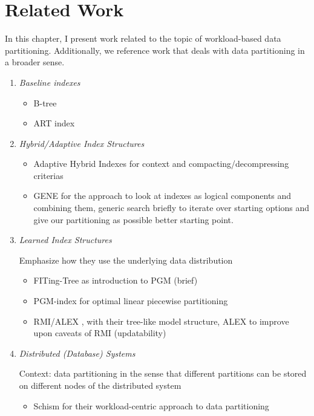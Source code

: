 \thispagestyle{plain}
\chapter{Related Work}

In this chapter, I present work related to the topic of workload-based data partitioning.
Additionally, we reference work that deals with data partitioning in a broader sense.

\begin{enumerate}
\item \emph{Baseline indexes}
    \begin{itemize}
        \item B-tree \cite{Bayer1970-rh}
        \item ART index \cite{Leis2013}
    \end{itemize}
\item \emph{Hybrid/Adaptive Index Structures}

    \begin{itemize}
    \item Adaptive Hybrid Indexes \cite{Anneser2022} for context and compacting/decompressing criterias
    \item GENE \cite{Dittrich2021} for the approach to look at indexes as logical components and combining them, generic
    search briefly to iterate over starting options and give our partitioning as possible better starting point.
    \end{itemize}

\item \emph{Learned Index Structures}

    Emphasize how they use the underlying data distribution
    \begin{itemize}
    \item FITing-Tree \cite{Galakatos2019} as introduction to PGM (brief)
    \item PGM-index \cite{Ferragina:2020pgm} for optimal linear piecewise partitioning
    \item RMI/ALEX \cite{Kraska2018}, \cite{Ding2020} with their tree-like model structure, ALEX to improve upon caveats of RMI (updatability)
    \end{itemize}

\item \emph{Distributed (Database) Systems}

    Context: data partitioning in the sense that different partitions can be stored on different nodes of the distributed system
    \begin{itemize}
    \item Schism \cite{Curino2010} for their workload-centric approach to data partitioning
    \end{itemize}
\end{enumerate}
